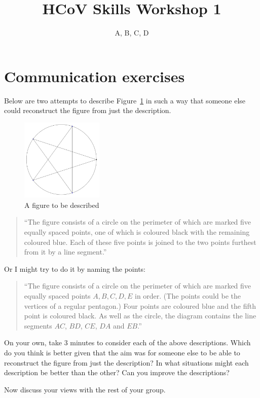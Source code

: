 \documentclass{UoESoMworkshop}
\title{HCoV Skills Workshop 1}
\author{A, B, C, D}
\begin{document}
\maketitle

\section{Communication exercises}

Below are two attempts to describe Figure~\ref{fig:completeGraph} in such a way that someone else could reconstruct the figure from just the description.

\begin{figure}[h]
    \centering
    \includegraphics[width=0.35\textwidth]{d9}
    \caption{A figure to be described}
    \label{fig:completeGraph}
\end{figure}

\begin{quote}
``The figure consists of a circle on the perimeter of which 
are marked five equally spaced points, one of which is coloured black with the remaining coloured blue. 
Each of these five points is joined to the two points furthest from it by a line segment.''
\end{quote} 

\noindent Or I might try to do it by naming the points: 
\begin{quote}
``The figure consists of a circle on the perimeter of which are marked five equally spaced points $A,B,C,D,E$ in order. 
(The points could be the vertices of a regular pentagon.) Four points are coloured blue and the fifth point is coloured black.
As well as the circle, the diagram contains the line segments $AC$, $BD$, $CE$, $DA$ and $EB$.''
\end{quote} 


\begin{exercise}[10 min]
On your own, take 3 minutes to consider each of the above descriptions. Which do you think is better given that the aim was for someone else to be able to reconstruct the figure from just the description? In what situations might each description be better than the other? Can you improve the descriptions?

Now discuss your views with the rest of your group.
\end{exercise}
\end{document}
